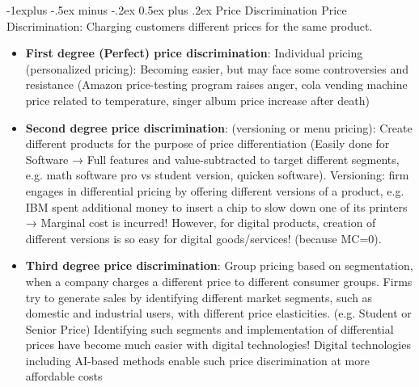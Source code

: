 \documentclass[12pt, landscape]{article}
\makeatletter
\renewcommand{\subsection}{\@startsection{subsection}{2}{0mm}%
                                {-1explus -.5ex minus -.2ex}%
                                {0.5ex plus .2ex}%
                                {\normalfont\normalsize\bfseries}}
\makeatother
\begin{document}
\begin{multicols*}{3}
\subsection{Price Discrimination}
Price Discrimination: Charging customers different prices for the same product. 
\begin{itemize}
\item \textbf{First degree (Perfect) price discrimination}: Individual pricing (personalized pricing): Becoming easier, but may face some controversies and resistance (Amazon price-testing program raises anger, cola vending machine price related to temperature, singer album price increase after death)
\item \textbf{Second degree price discrimination}: (versioning or menu pricing): Create different products for the purpose of price differentiation (Easily done for Software → Full features and value-subtracted to target different segments, e.g. math software pro vs student version, quicken software). Versioning: firm engages in differential pricing by offering different versions of a product, e.g. IBM spent additional money to insert a chip to slow down one of its printers → Marginal cost is incurred! However, for digital products, creation of different versions is so easy for digital goods/services! (because MC=0).
\item \textbf{Third degree price discrimination}: Group pricing based on segmentation, when a company charges a different price to different consumer groups. Firms try to generate sales by identifying different market segments, such as domestic and industrial users, with different price elasticities. (e.g. Student or Senior Price) Identifying such segments and implementation of differential prices have become much easier with digital technologies! Digital technologies including AI-based methods enable such price discrimination at more affordable costs
\end{itemize}


\end{multicols*}
\end{document}

